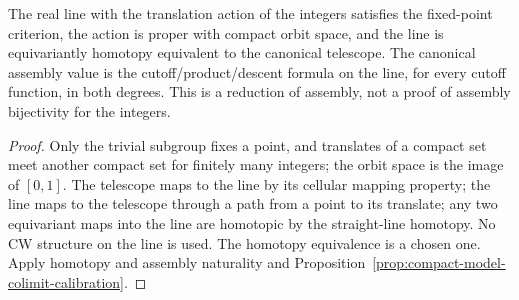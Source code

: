 \begin{proposition}\label{prop:integer-line-reduction}
\leanok
The real line with the translation action of the integers satisfies the
fixed-point criterion, the action is proper with compact orbit space, and the
line is equivariantly homotopy equivalent to the canonical telescope. The
canonical assembly value is the cutoff/product/descent formula on the line,
for every cutoff function, in both degrees. This is a reduction of assembly,
not a proof of assembly bijectivity for the integers.
\end{proposition}
\begin{proof}
\leanok
Only the trivial subgroup fixes a point, and translates of a compact set meet
another compact set for finitely many integers; the orbit space is the image of
$[0,1]$. The telescope maps to the line by its cellular mapping property; the
line maps to the telescope through a path from a point to its translate; any
two equivariant maps into the line are homotopic by the straight-line
homotopy. No CW structure on the line is used. The homotopy equivalence is a
chosen one. Apply homotopy and assembly naturality and
Proposition~\ref{prop:compact-model-colimit-calibration}.
\end{proof}

